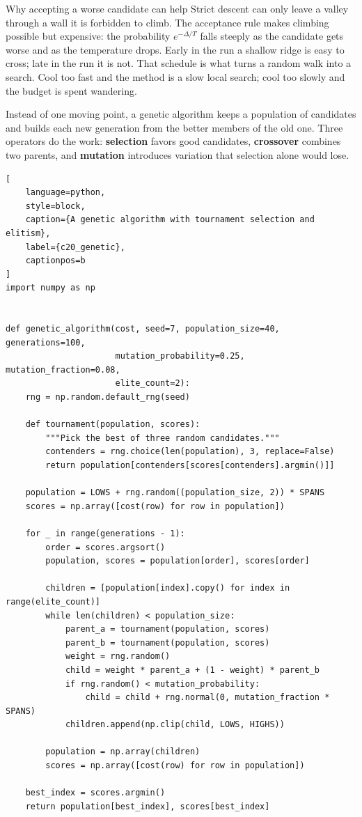 \begin{ExplainBox}{Why accepting a worse candidate can help}
Strict descent can only leave a valley through a wall it is forbidden to climb.
The acceptance rule makes climbing possible but expensive: the probability
$e^{-\Delta/T}$ falls steeply as the candidate gets worse and as the temperature
drops. Early in the run a shallow ridge is easy to cross; late in the run it is
not. That schedule is what turns a random walk into a search. Cool too fast and
the method is a slow local search; cool too slowly and the budget is spent
wandering.
\end{ExplainBox}


Instead of one moving point, a genetic algorithm keeps a population of
candidates and builds each new generation from the better members of the old
one. Three operators do the work: \textbf{selection} favors good candidates,
\textbf{crossover} combines two parents, and \textbf{mutation} introduces
variation that selection alone would lose.

\begin{lstlisting}[
    language=python,
    style=block,
    caption={A genetic algorithm with tournament selection and elitism},
    label={c20_genetic},
    captionpos=b
]
import numpy as np


def genetic_algorithm(cost, seed=7, population_size=40, generations=100,
                      mutation_probability=0.25, mutation_fraction=0.08,
                      elite_count=2):
    rng = np.random.default_rng(seed)

    def tournament(population, scores):
        """Pick the best of three random candidates."""
        contenders = rng.choice(len(population), 3, replace=False)
        return population[contenders[scores[contenders].argmin()]]

    population = LOWS + rng.random((population_size, 2)) * SPANS
    scores = np.array([cost(row) for row in population])

    for _ in range(generations - 1):
        order = scores.argsort()
        population, scores = population[order], scores[order]

        children = [population[index].copy() for index in range(elite_count)]
        while len(children) < population_size:
            parent_a = tournament(population, scores)
            parent_b = tournament(population, scores)
            weight = rng.random()
            child = weight * parent_a + (1 - weight) * parent_b
            if rng.random() < mutation_probability:
                child = child + rng.normal(0, mutation_fraction * SPANS)
            children.append(np.clip(child, LOWS, HIGHS))

        population = np.array(children)
        scores = np.array([cost(row) for row in population])

    best_index = scores.argmin()
    return population[best_index], scores[best_index]
\end{lstlisting}

